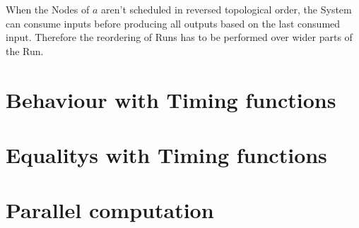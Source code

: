 When the Nodes of \(a\) aren't scheduled in reversed topological order, the System can consume inputs before producing all outputs based on the last consumed input.
Therefore the reordering of Runs has to be performed over wider parts of the Run.

\section{Behaviour with Timing functions}
\section{Equalitys with Timing functions}
\section{Parallel computation}
